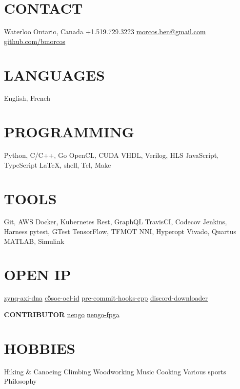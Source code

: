 \documentclass[a4paper,nocolors]{cv-friggeri-ben}
\begin{document}


\begin{aside} %
    \section{CONTACT}
    \hfill Waterloo
    \hfill Ontario, Canada
    \vspace{0.5\baselineskip} \hfill +1.519.729.3223
    \hfill \href{mailto:morcos.ben@gmail.com}{morcos.ben@gmail.com}
    \vspace{0.5\baselineskip} \hfill%
    \href{https://github.com/bmorcos}{github.com/bmorcos}
    \section{LANGUAGES}
    English, French
    \section{PROGRAMMING}
    Python, C/C++, Go
    OpenCL, CUDA
    VHDL, Verilog, HLS
    JavaScript, TypeScript
    \LaTeX, shell, Tcl, Make
    \section{TOOLS}
    Git, AWS
    Docker, Kubernetes
    Rest, GraphQL
    TravisCI, Codecov
    Jenkins, Harness
    pytest, GTest
    TensorFlow, TFMOT
    NNI, Hyperopt
    Vivado, Quartus
    MATLAB, Simulink
    \section{OPEN IP}
    \href{https://github.com/abr/zynq-axi-dna}{zynq-axi-dna}
    \href{https://github.com/abr/c5soc-ocl-id}{c5soc-ocl-id}
    \href{https://github.com/bmorcos/pre-commit-hooks-cpp}{pre-commit-hooks-cpp}
    \href{https://github.com/bmorcos/discord-downloader}{discord-downloader}
    \par\vspace{0.5\baselineskip}\textbf{CONTRIBUTOR}
    \href{https://github.com/nengo/nengo}{nengo}
    \href{https://github.com/nengo/nengo-fpga}{nengo-fpga}
    \section{HOBBIES}
    Hiking \& Canoeing
    Climbing
    Woodworking
    Music
    Cooking
    Various sports
    Philosophy
\end{aside}
\end{document}
